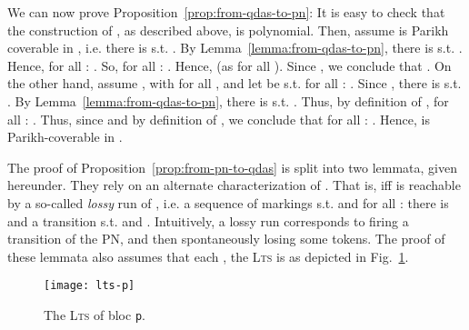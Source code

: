 \documentclass[runningheads,oribibl,]{article}
\newcommand{\lts}{\textsc{Lts}\xspace}
\newenvironment{proof}{\noindent{\it Proof.\hspace*{.5cm}}}{}
\newcommand{\qed}{\hfill}
\begin{document}
We can now prove Proposition~\ref{prop:from-qdas-to-pn}:
\begin{proof}
  It is easy to check that the construction of , as described
  above, is polynomial. Then, assume  is Parikh coverable in ,
  i.e. there is 
  s.t. . By Lemma~\ref{lemma:from-qdas-to-pn},
  there is  s.t. . Hence, for
  all : . So, for all :
  . Hence,  (as 
  for all ). Since , we conclude that
  . On the other hand, assume ,
  with  for all , and let  be s.t. for all
  : . Since , there is
   s.t. . By
  Lemma~\ref{lemma:from-qdas-to-pn}, there is
   s.t. . Thus, by
  definition of , for all : . Thus,
  since  and by definition of , we conclude that for all
  : . Hence,  is
  Parikh-coverable in .\qed
\end{proof}

\propfrompntoqdas*

The proof of Proposition~\ref{prop:from-pn-to-qdas} is split into two
lemmata, given hereunder. They rely on an alternate characterization of
. That is,  iff  is reachable by a
so-called \emph{lossy} run of , i.e. a sequence of markings
 s.t.  and for all : there is  and a transition 
s.t.  and
. Intuitively, a lossy run corresponds to
firing a transition of the PN, and then spontaneously losing some
tokens. The proof of these lemmata also assumes that each ,
the \lts  is as depicted in Fig.~\ref{fig:lts-p}.

\begin{figure}
  \centering
  \texttt{[image: lts-p]}
  \caption{The \lts of bloc {\tt p}.}
  \label{fig:lts-p}
\end{figure}
\end{document}
